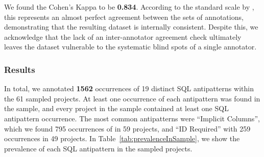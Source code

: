 We found the Cohen's Kappa to be \textbf{\num{0.834}}. According to the standard scale by , this represents an almost perfect agreement between the sets of annotations, demonstrating that the resulting dataset is internally consistent. Despite this, we acknowledge that the lack of an inter-annotator agreement check ultimately leaves the dataset vulnerable to the systematic blind spots of a single annotator.

\subsubsection*{Results}

In total, we annotated \textbf{\num{1562}} occurrences of 19 distinct SQL antipatterns within the \num{61} sampled projects. At least one occurrence of each antipattern was found in the sample, and every project in the sample contained at least one SQL antipattern occurrence. The most common antipatterns were “Implicit Columns”, which we found \num{795} occurrences of in 59 projects, and “ID Required” with \num{259} occurrences in \num{49} projects. In Table~\ref{tab:prevalenceInSample}, we show the prevalence of each SQL antipattern in the sampled projects.


